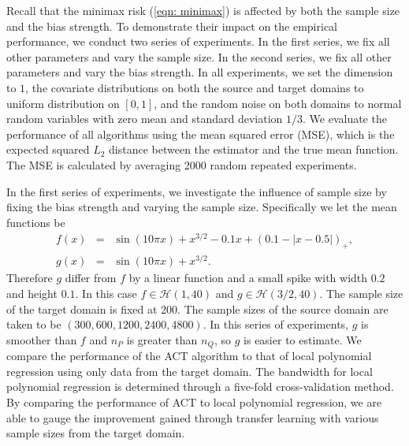 \documentclass{article}
\def\H{\mathcal{H}}
\newcommand{\beas}{\begin{eqnarray*}}
\newcommand{\eeas}{\end{eqnarray*}}
\begin{document}
Recall that the minimax risk (\ref{eqn: minimax}) is affected by both the sample size and the bias strength. To demonstrate their impact on the empirical performance, we conduct two series of experiments. In the first series, we fix all other parameters and vary the sample size. In the second series, we fix all other parameters and vary the bias strength.
In all experiments, we set the dimension to $1$, the covariate distributions on both the source and target domains to uniform distribution on $[0,1]$, and the random noise on both domains to normal random variables with zero mean and standard deviation $1/3$. We evaluate the performance of all algorithms using the mean squared error (MSE), which is the expected squared $L_2$ distance between the estimator and the true mean function. The MSE is calculated by averaging 2000 random repeated experiments.

In the first series of experiments, we investigate the influence of sample size by fixing the bias strength and varying the sample size. Specifically we let the mean functions be
\beas
f(x)&=&\sin(10\pi x)+x^{3/2}-0.1x+(0.1-|x-0.5|)_+, \\
g(x)&=&\sin(10\pi x)+x^{3/2}.
\eeas
Therefore $g$ differ from $f$ by a linear function and a small spike with width $0.2$ and height $0.1$. In this case $f\in \H(1,40)$ and $g\in \H(3/2,40)$. The sample size of the target domain is fixed at 200. The sample sizes of the source domain are taken to be $(300,600,1200,2400,4800)$. In this series of experiments, $g$ is smoother than $f$ and $n_P$ is greater than $n_Q$, so $g$ is easier to estimate. 
We compare the performance of the ACT algorithm to that of local polynomial regression using only data from the target domain. The bandwidth for local polynomial regression is determined through a five-fold cross-validation method. By comparing the performance of ACT to local polynomial regression, we are able to gauge the improvement gained through transfer learning with various sample sizes from the target domain.
\end{document}
